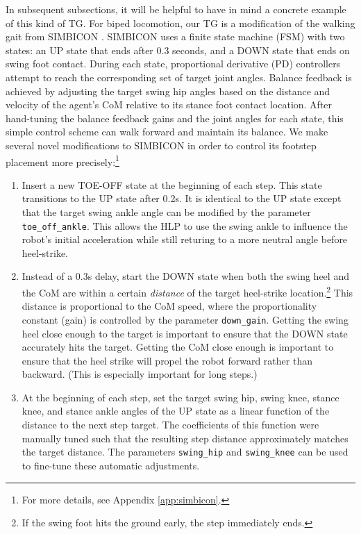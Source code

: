 \documentclass[conference]{IEEEtran}
\begin{document}
In subsequent subsections, it will be helpful to have in mind a concrete example of this kind of TG.
For biped locomotion, our TG is a modification of the walking gait from SIMBICON \citep{yin2007simbicon}.
SIMBICON uses a finite state machine (FSM) with two states: an UP state that ends after 0.3 seconds, and a DOWN state that ends on swing foot contact.
During each state, proportional derivative (PD) controllers attempt to reach the corresponding set of target joint angles.
Balance feedback is achieved by adjusting the target swing hip angles based on the distance and velocity of the agent's CoM relative to its stance foot contact location.
After hand-tuning the balance feedback gains and the joint angles for each state, this simple control scheme can walk forward and maintain its balance.
We make several novel modifications to SIMBICON in order to control its footstep placement more precisely:\footnote{
For more details, see Appendix \ref{app:simbicon}.}
\begin{enumerate}
  \item Insert a new TOE-OFF state at the beginning of each step.
    This state transitions to the UP state after 0.2s.
    It is identical to the UP state except that the target swing ankle angle can be modified by the parameter \texttt{toe\_off\_ankle}.
    This allows the HLP to use the swing ankle to influence the robot's initial acceleration while still returing to a more neutral angle before heel-strike.

  \item Instead of a 0.3s delay, start the DOWN state when both the swing heel and the CoM are within a certain \emph{distance} of the target heel-strike location.\footnote{
    If the swing foot hits the ground early, the step immediately ends.}
    This distance is proportional to the CoM speed, where the proportionality constant (gain) is controlled by the parameter \texttt{down\_gain}.
    Getting the swing heel close enough to the target is important to ensure that the DOWN state accurately hits the target.
    Getting the CoM close enough is important to ensure that the heel strike will propel the robot forward rather than backward.
    (This is especially important for long steps.)

  \item At the beginning of each step, set the target swing hip, swing knee, stance knee, and stance ankle angles of the UP state as a linear function of the distance to the next step target.
    The coefficients of this function were manually tuned such that the resulting step distance approximately matches the target distance.
    The parameters \texttt{swing\_hip} and \texttt{swing\_knee} can be used to fine-tune these automatic adjustments.
\end{enumerate}
\end{document}
